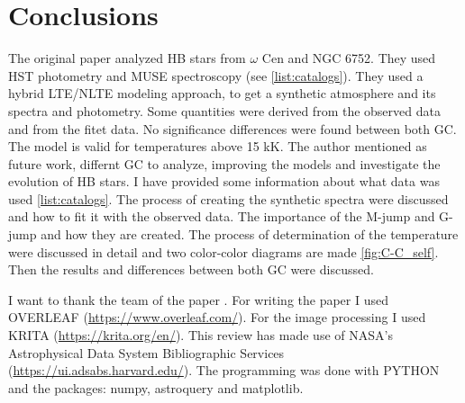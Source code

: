 \documentclass{aa}
\begin{document}
\section{Conclusions}
\label{sec:6}
The original paper analyzed HB stars from $\omega$ Cen and NGC 6752. They used HST photometry and MUSE spectroscopy  (see \ref{list:catalogs}). They used a hybrid LTE/NLTE modeling approach, to get a synthetic atmosphere and its spectra and photometry. Some quantities were derived from the observed data and from the fitet data. No significance differences were found between both GC. The model is valid for temperatures above 15 kK. 
The author mentioned as future work, differnt GC to analyze, improving the models and investigate the evolution of HB stars. 
I have provided some information about what data was used \ref{list:catalogs}. The process of creating the synthetic spectra were discussed and how to fit it with the observed data. The importance of the M-jump and G-jump and how they are created. The process of determination of the temperature were discussed in detail and two color-color diagrams are made \ref{fig:C-C_self}. Then the results and differences between both GC were discussed.

\begin{acknowledgements}
      I want to thank the team of the paper \citep{2023A&A...677A..86L}. For writing the paper I used OVERLEAF (\href{https://www.overleaf.com/}{https://www.overleaf.com/}). For the image processing I used KRITA (\href{https://krita.org/en/}{https://krita.org/en/}). This review has made use of NASA's Astrophysical Data System Bibliographic Services (\href{https://ui.adsabs.harvard.edu/}{https://ui.adsabs.harvard.edu/}). The programming was done with PYTHON and the packages: numpy, astroquery and matplotlib. 
\end{acknowledgements}


\end{document}
